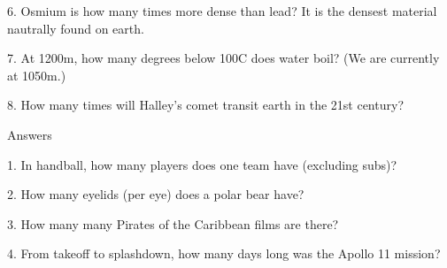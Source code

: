 \begin{frame}
\begin{center}
\Large
6. Osmium is how many times more dense than lead? It is the densest material nautrally found on earth.
\end{center}
\end{frame}
\begin{frame}
\begin{center}
\Large
7. At 1200m, how many degrees below 100\textdegree C does water boil? (We are currently at 1050m.)
\end{center}
\end{frame}
\begin{frame}
\begin{center}
\Large
8. How many times will Halley's comet transit earth in the 21st century?
\end{center}
\end{frame}
\begin{frame}
\begin{center}
\Huge
Answers
\end{center}
\end{frame}
\begin{frame}
\begin{center}
\Large
1. In handball, how many players does one team have (excluding subs)?
\\
\end{center}
\end{frame}
\begin{frame}
\begin{center}
\Large
2. How many eyelids (per eye) does a polar bear have?
\\
\end{center}
\end{frame}
\begin{frame}
\begin{center}
\Large
3. How many many Pirates of the Caribbean films are there?
\\
\end{center}
\end{frame}
\begin{frame}
\begin{center}
\Large
4. From takeoff to splashdown, how many days long was the Apollo 11 mission?
\\
\end{center}
\end{frame}
